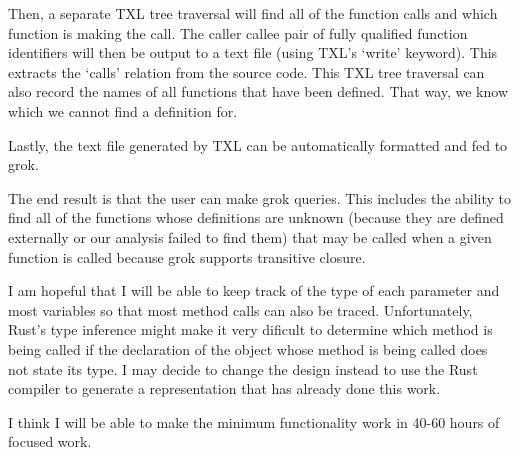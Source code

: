 \documentclass[11pt]{article}
\begin{document}
Then, a separate TXL tree traversal will find all of the function calls and which function is making the call.
The caller callee pair of fully qualified function identifiers will then be output to a text file (using TXL's `write' keyword).
This extracts the `calls' relation from the source code.
This TXL tree traversal can also record the names of all functions that have been defined.
That way, we know which we cannot find a definition for.

Lastly, the text file generated by TXL can be automatically formatted and fed to grok.

The end result is that the user can make grok queries.
This includes the ability to find all of the functions whose definitions are unknown (because they are defined externally or our analysis failed to find them) that may be called when a given function is called because grok supports transitive closure.

I am hopeful that I will be able to keep track of the type of each parameter and most variables so that most method calls can also be traced.
Unfortunately, Rust's type inference might make it very dificult to determine which method is being called if the declaration of the object whose method is being called does not state its type.
I may decide to change the design instead to use the Rust compiler to generate a representation that has already done this work.



I think I will be able to make the minimum functionality work in 40-60 hours of focused work.


\end{document}
